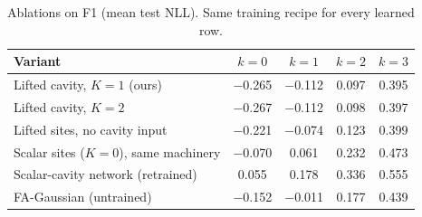 \begin{table}[t]
\centering\small
\caption{\label{tab:ablation}Ablations on F1 (mean test NLL). Same training recipe for every learned row.}
\begin{tabular}{lcccc}
\toprule
Variant & $k{=}0$ & $k{=}1$ & $k{=}2$ & $k{=}3$\\
\midrule
Lifted cavity, $K=1$ (ours) & $-$0.265 & $-$0.112 & 0.097 & 0.395\\
Lifted cavity, $K=2$ & $-$0.267 & $-$0.112 & 0.098 & 0.397\\
Lifted sites, no cavity input & $-$0.221 & $-$0.074 & 0.123 & 0.399\\
Scalar sites ($K=0$), same machinery & $-$0.070 & 0.061 & 0.232 & 0.473\\
Scalar-cavity network (retrained) & 0.055 & 0.178 & 0.336 & 0.555\\
FA-Gaussian (untrained) & $-$0.152 & $-$0.011 & 0.177 & 0.439\\
\bottomrule
\end{tabular}
\end{table}
